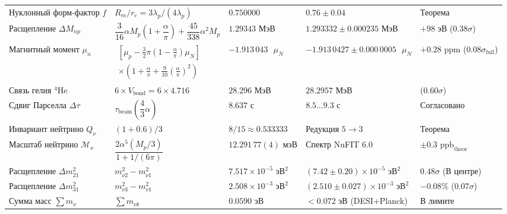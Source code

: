 \documentclass[11pt,a4paper]{article}
\theoremstyle{definition}
\theoremstyle{remark}
\begin{document}
\begin{xltabular}{\textwidth}{
>{\raggedright\arraybackslash}p{3.8cm}
>{\centering\arraybackslash}X
>{\centering\arraybackslash}p{2.7cm}
>{\centering\arraybackslash}p{2.8cm}
>{\centering\arraybackslash}p{2.0cm}
}
Нуклонный форм-фактор $f$ & $R_m / r_c = 3\lambda_p / (4\lambda_p)$ & $0.750000$ & $0.76 \pm 0.04$ & Теорема \\

Расщепление $\Delta M_{np}$ & $\dfrac{3}{16}\alpha M_p \left(1 + \dfrac{\alpha}{\pi}\right) + \dfrac{45}{338}\alpha^2 M_p$ & $1.29343\text{ МэВ}$ & $1.293332 \pm 0.000235\text{ МэВ}$ & $+98\text{ эВ}$ ($0.38\sigma$) \\

Магнитный момент $\mu_n$ & $\begin{gathered} \left[\mu_p - \tfrac{3}{2}\pi\left(1 - \tfrac{\alpha}{\pi}\right)\mu_N\right] \\ \times \left(1 + \tfrac{\alpha}{\pi} + \tfrac{9}{10}\left(\tfrac{\alpha}{\pi}\right)^2\right) \end{gathered}$ & $-1.913\,043\text{ }\mu_N$ & $-1.913\,0427 \pm 0.000\,0005\text{ }\mu_N$ & $+0.28\text{ ppm}$ ($0.08\sigma_{\mathrm{full}}$) \\

Связь гелия $^4\mathrm{He}$ & $6 \times V_{\mathrm{bond}} = 6 \times 4.716$ & $28.296\text{ МэВ}$ & $28.2957\text{ МэВ}$ & ($0.60\sigma$) \\

Сдвиг Парселла $\Delta\tau$ & $\tau_{\mathrm{beam}}\left(\dfrac{4}{3}\alpha\right)$ & $8.637\text{ с}$ & $8.5\dots 9.3\text{ с}$ & Согласовано \\

Инвариант нейтрино $Q_\nu$ & $(1 + 0.6) / 3$ & $8/15 \approx 0.533333$ & Редукция $5 \to 3$ & Теорема \\

Масштаб нейтрино $\mathcal{M}_\nu$ & $\dfrac{2\alpha^5(M_p/3)}{1 + 1/(6\pi)}$ & $12.291\,77(4)\text{ мэВ}$ & Спектр NuFIT 6.0 & $\pm 0.3\text{ ppb}_{\mathrm{theor}}$ \\

Расщепление $\Delta m_{21}^2$ & $m_{\nu 2}^2 - m_{\nu 1}^2$ & $7.517 \times 10^{-5}\text{ эВ}^2$ & $(7.42 \pm 0.20)\times 10^{-5}\text{ эВ}^2$ & $0.48\sigma$ (В центре) \\

Расщепление $\Delta m_{31}^2$ & $m_{\nu 3}^2 - m_{\nu 1}^2$ & $2.508 \times 10^{-3}\text{ эВ}^2$ & $(2.510 \pm 0.027)\times 10^{-3}\text{ эВ}^2$ & $-0.08\%$ ($0.07\sigma$) \\

Сумма масс $\sum m_\nu$ & $\sum m_{\nu k}$ & $0.0590\text{ эВ}$ & $< 0.072\text{ эВ}$ (DESI+Planck) & В лимите \\


\end{xltabular}
\end{document}
